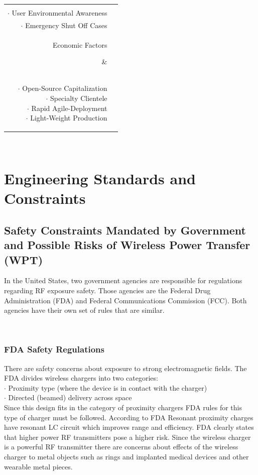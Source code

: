 \documentclass[12pt]{article}
\begin{document}
\begin{table}[h!]
\begin{tabular} {| r | c | }
{$\cdot$ Chemical Pollution\\ $\cdot$ User Environmental Awareness\\ $\cdot$ Emergency Shut Off Cases}\\
\hline
\parbox{0.3\linewidth}{\raggedleft Economic Factors} &   \parbox{0.65\linewidth}{\hfill \\
$\cdot$ Open-Source Capitalization\\ $\cdot$ Specialty Clientele\\ $\cdot$ Rapid Agile-Deployment\\ $\cdot$ Light-Weight Production}\\
\hline
\end{tabular}
\end{table}
\hfill \\

\section{Engineering Standards and Constraints}

\subsection{Safety Constraints Mandated by Government and Possible Risks of Wireless Power Transfer (WPT)}

\indent \indent
In the United States, two government agencies are responsible for regulations regarding RF exposure safety. Those agencies are the Federal Drug Administration (FDA) and Federal Communications Commission  (FCC). Both agencies have their own set of rules that are similar.

\hfill \\
\pagebreak


\subsubsection{FDA Safety Regulations}
There are safety concerns about exposure to strong electromagnetic fields. The FDA divides wireless chargers into two categories:\\
$\cdot$ \indent Proximity type (where the device is in contact with the charger)\\
$\cdot$ \indent Directed (beamed) delivery across space\\

\indent
Since this design fits in the category of  proximity chargers FDA rules for this type of charger must be followed. According to FDA Resonant proximity charges have resonant LC circuit which improves range and efficiency. FDA clearly states that higher power RF transmitters pose a higher risk. Since the wireless charger is a powerful RF transmitter there are concerns about effects of the wireless charger to metal objects such as rings and implanted medical devices and other wearable metal pieces.\\
\end{document}
